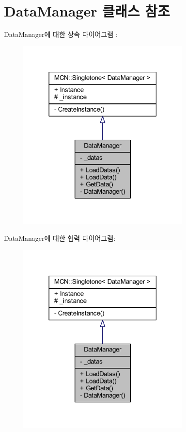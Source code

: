 \hypertarget{class_data_manager}{}\section{Data\+Manager 클래스 참조}
\label{class_data_manager}


Data\+Manager에 대한 상속 다이어그램 \+: 
\nopagebreak
\begin{figure}[H]
\begin{center}
\leavevmode
\includegraphics[width=246pt]{class_data_manager__inherit__graph}
\end{center}
\end{figure}


Data\+Manager에 대한 협력 다이어그램\+:
\nopagebreak
\begin{figure}[H]
\begin{center}
\leavevmode
\includegraphics[width=246pt]{class_data_manager__coll__graph}
\end{center}
\end{figure}
